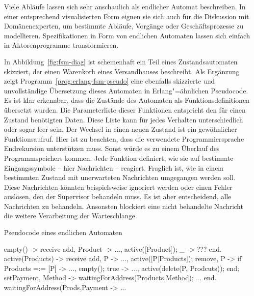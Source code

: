 Viele Abläufe lassen sich sehr anschaulich als endlicher Automat beschreiben. In einer entsprechend visualisierten Form eignen sie sich auch für die Diskussion mit Domänenexperten, um bestimmte Abläufe, Vorgänge oder Geschäftsprozesse zu modellieren. Spezifikationen in Form von endlichen Automaten lassen sich einfach in Aktorenprogramme transformieren.

In Abbildung~\ref{fig:fsm-diag} ist schemenhaft ein Teil eines Zustandsautomaten skizziert, der einen Warenkorb eines Versandhauses beschreibt. Als Ergänzung zeigt Programm~\ref{prog:erlang-fsm-pseudo} eine ebenfalls skizzierte und unvollständige Übersetzung dieses Automaten in Erlang"=ähnlichen Pseudocode. Es ist klar erkennbar, dass die Zustände des Automaten als Funktionsdefinitionen übersetzt wurden. Die Parameterliste dieser Funktionen entspricht den für einen Zustand benötigten Daten. Diese Liste kann für jedes Verhalten unterschiedlich oder sogar leer sein. Der Wechsel in einen neuen Zustand ist ein gewöhnlicher Funktionsaufruf. Hier ist zu beachten, dass die verwendete Programmiersprache Endrekursion unterstützen muss. Sonst würde es zu einem Überlauf des Programmspeichers kommen. Jede Funktion definiert, wie sie auf bestimmte Eingangssymbole -- hier Nachrichten --  reagiert. Fraglich ist, wie in einem bestimmten Zustand mit unerwarteten Nachrichten umgegangen werden soll. Diese Nachrichten könnten beispielsweise ignoriert werden oder einen Fehler auslösen, den der Supervisor behandeln muss. Es ist aber entscheidend, alle Nachrichten zu behandeln. Ansonsten blockiert eine nicht behandelte Nachricht die weitere Verarbeitung der Warteschlange.

\begin{program}[!hbt]
\caption{Pseudocode eines endlichen Automaten}
\label{prog:erlang-fsm-pseudo}
\begin{ErlangCode}
empty() ->
	receive
		{ add, Product } -> ..., active([Product]);
		_ -> ??? %
	end.
active(Products) ->
	receive
		{ add, P } -> ..., active([P|Products]);
		{ remove, P } -> if Products =:= [P] -> ..., empty();
												true -> ..., active(delete(P, Prodcuts));
										 end;
		{ setPayment, Method } -> waitingForAddress({Products,Method});
		...
	end.
waitingForAddress({Prods,Payment} -> ...
\end{ErlangCode}
\end{program}

